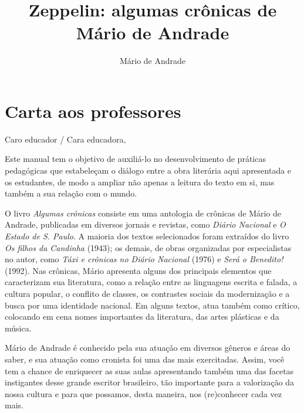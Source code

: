 \documentclass{article}
\begin{document}
\newcommand{\AutorLivro}{Mário de Andrade}
\newcommand{\TituloLivro}{Zeppelin: algumas crônicas de Mário de Andrade}
\newcommand{\Tema}{Ficção, mistério e fantasia}
\newcommand{\Genero}{Conto, crônica e novela}
\newcommand{\issnppub}{---}
\newcommand{\issnepub}{---}
\newcommand{\colaborador}{\textbf{Rodrigo Ribeiro Neves} é uma pessoa incrível e vai fazer um bom serviço.}


\title{\TituloLivro}
\author{\AutorLivro}
\def\authornotes{\colaborador}

\date{}
\maketitle
\tableofcontents

\pagebreak

\section{Carta aos professores}

\reversemarginpar
\marginparwidth=5cm

Caro educador / Cara educadora,\\\bigskip

Este manual tem o objetivo de auxiliá-lo no desenvolvimento de práticas
pedagógicas que estabeleçam o diálogo entre a obra literária aqui
apresentada e os estudantes, de modo a ampliar não apenas a leitura do
texto em si, mas também a sua relação com o mundo.

O livro \emph{Algumas crônicas} consiste em uma antologia de crônicas de
Mário de Andrade, publicadas em diversos jornais e revistas, como
\emph{Diário Nacional} e \emph{O Estado de S. Paulo}. A maioria dos
textos selecionados foram extraídos do livro \emph{Os filhos da
Candinha} (1943); os demais, de obras organizadas por especialistas no
autor, como \emph{Táxi e crônicas no Diário Nacional} (1976) e
\emph{Será o Benedito!} (1992). Nas crônicas, Mário apresenta alguns dos
principais elementos que caracterizam sua literatura, como a relação
entre as linguagens escrita e falada, a cultura popular, o conflito de
classes, os contrastes sociais da modernização e a busca por uma
identidade nacional. Em alguns textos, atua também como crítico,
colocando em cena nomes importantes da literatura, das artes plásticas e
da música.

Mário de Andrade é conhecido pela sua atuação em diversos gêneros e
áreas do saber, e sua atuação como cronista foi uma das mais
exercitadas. Assim, você tem a chance de enriquecer as suas aulas
apresentando também uma das facetas instigantes desse grande escritor
brasileiro, tão importante para a valorização da nossa cultura e para
que possamos, desta maneira, nos (re)conhecer cada vez mais.
\end{document}
